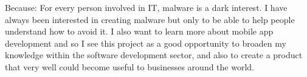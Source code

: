 \spacedhrule{1.6em}{-0.4em}  
  

\inlineheadsection
  {Because:}
  {For every person involved in IT, malware is a dark interest. I have always been interested in creating malware but only to be able to help people understand how to avoid it. I also want to learn more about mobile app development and so I see this project as a good opportunity to broaden my knowledge within the software development sector, and also to create a product that very well could become useful to businesses around the world.}